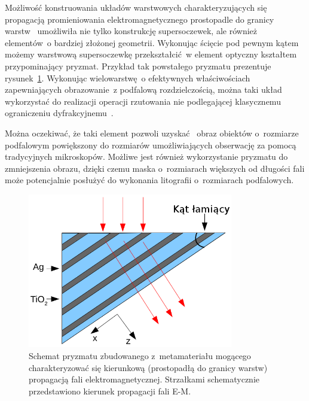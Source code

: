 Możliwość konstruowania układów warstwowych charakteryzujących się propagacją promieniowania elektromagnetycznego prostopadle do granicy warstw~\cite{wood2006directed,quan2006refraction,kotynski2011sub} umożliwiła nie tylko konstrukcję supersoczewek, ale również elementów~o bardziej złożonej geometrii. Wykonując ścięcie pod pewnym kątem możemy warstwową supersoczewkę przekształcić~w element optyczny kształtem przypominający pryzmat. Przykład tak powstałego pryzmatu prezentuje rysunek~\ref{fig:prism-schema}. Wykonując wielowarstwę~o efektywnych właściwościach zapewniających obrazowanie~z podfalową rozdzielczością, można taki układ wykorzystać do realizacji operacji rzutowania nie podlegającej klasycznemu ograniczeniu dyfrakcyjnemu~\cite{prism2010}. 

Można oczekiwać, że taki element pozwoli uzyskać~ obraz obiektów o~rozmiarze podfalowym powiększony do rozmiarów umożliwiających obserwację za pomocą tradycyjnych mikroskopów. Możliwe jest również wykorzystanie pryzmatu do zmniejszenia obrazu, dzięki czemu maska o~rozmiarach większych od długości fali może potencjalnie posłużyć do wykonania litografii o~rozmiarach podfalowych.

			\begin{figure}[htb]
				\includegraphics[width=0.8\textwidth]{images/multilayer/prism.png}
				\caption{Schemat pryzmatu zbudowanego z~metamateriału mogącego charakteryzować się kierunkową (prostopadłą do granicy warstw) propagacją fali elektromagnetycznej. Strzałkami schematycznie przedstawiono kierunek propagacji fali E-M.}
				\label{fig:prism-schema}
			\end{figure}


